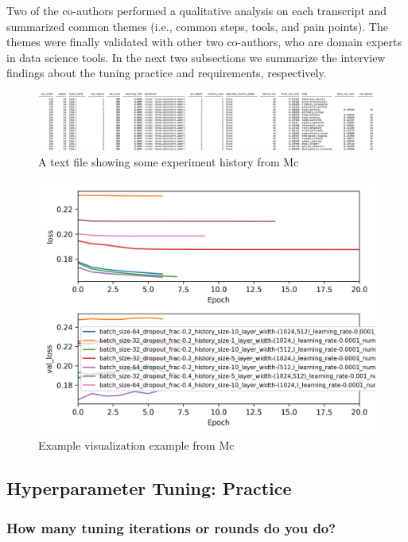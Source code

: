 \documentclass[preprint]{vgtc}        %
\begin{document}
Two of the co-authors performed a qualitative analysis on each transcript and summarized common themes (i.e., common steps, tools, and pain points). The themes were finally validated with other two co-authors, who are domain experts in data science tools. In the next two subsections we summarize the interview findings about the tuning practice and requirements, respectively.
\begin{figure}
 \includegraphics[width=\textwidth]{pictures/realtable}
 \caption{A text file showing some experiment history from Mc}
 \label{fig:realtable}
\end{figure}
\begin{figure}
 \includegraphics[width=\columnwidth]{pictures/train_histories}
 \caption{Example visualization example from Mc}
 \label{fig:train_histories}
\end{figure}
\subsection {Hyperparameter Tuning: Practice}
\subsubsection{How many tuning iterations or rounds do you do?}
\end{document}
